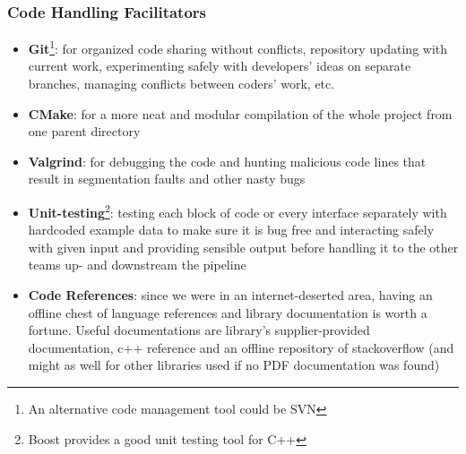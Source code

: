 \subsubsection{Code Handling Facilitators}
\begin{itemize}
\item \textbf{Git}\footnote{An alternative code management tool could be SVN}: for organized code sharing without conflicts, repository updating with current work, experimenting safely with developers' ideas on separate branches, managing conflicts between coders' work, etc.
\item \textbf{CMake}: for a more neat and modular compilation of the whole project from one parent directory
\item \textbf{Valgrind}: for debugging the code and hunting malicious code lines that result in segmentation faults and other nasty bugs
\item \textbf{Unit-testing}\footnote{Boost provides a good unit testing tool for C++}: testing each block of code or every interface separately with hardcoded example data to make sure it is bug free and interacting safely with given input and providing sensible output before handling it to the other teams up- and downstream the pipeline
\item \textbf{Code References}: since we were in an internet-deserted area, having an offline chest of language references and library documentation is worth a fortune. Useful documentations are library's supplier-provided documentation, c++ reference and an offline repository of stackoverflow (and might as well for other libraries used if no PDF documentation was found)
\end{itemize}


